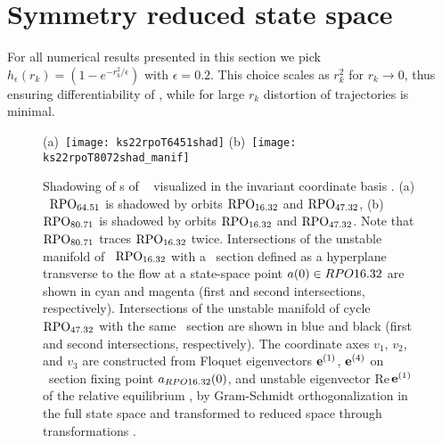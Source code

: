 \documentclass[aip,cha,showpacs,reprint]{revtex4-1} %
\begin{document}
\section{Symmetry reduced state space}


For all numerical results presented in this section we pick
$h_\epsilon(r_k)=(1-e^{-r_k^2/\epsilon})$ with $\epsilon=0.2$. This choice
scales as $r_k^2$ for $r_k\rightarrow 0$, thus ensuring differentiability
of , while for large $r_k$ distortion of
trajectories is minimal.

\begin{figure}
 (a)~\texttt{[image: ks22rpoT6451shad]}
 (b)~\texttt{[image: ks22rpoT8072shad\_manif]}
\caption{\label{f:rpo_shad}
 Shadowing of \rpo s of \KSe\
visualized in the invariant coordinate basis .
(a) \Rpo\ $\RPO{64.51}$ is shadowed by orbits $\RPO{16.32}$ and
$\RPO{47.32}$, (b) \Rpo\ $\RPO{80.71}$ is shadowed by orbits
$\RPO{16.32}$ and $\RPO{47.32}$. Note that $\RPO{80.71}$ traces
$\RPO{16.32}$ twice. Intersections of the unstable manifold of \rpo\
$\RPO{16.32}$ with a \Poincare\ section defined as a hyperplane
transverse to the flow at a state-space point $\ssp(0) \in RPO{16.32}$ are
shown in cyan and magenta (first and second intersections, respectively).
Intersections of the unstable manifold of cycle $\RPO{47.32}$ with the
same \Poincare\ section are shown in blue and black (first and second
intersections, respectively). The coordinate axes $v_1$, $v_2$, and $v_3$
are constructed from Floquet eigenvectors $\jEigvec[1]$, $\jEigvec[4]$ on
\Poincare\ section fixing point $\ssp_{RPO{16.32}}(0)$, and unstable
eigenvector {Re\,}$\jEigvec[1]$ of the relative equilibrium
\REQV{}{1}, by Gram-Schmidt orthogonalization in the full state space and
transformed to reduced space through transformations
\refeq{eq:SO2polarExt}.
}
\end{figure}
\end{document}
